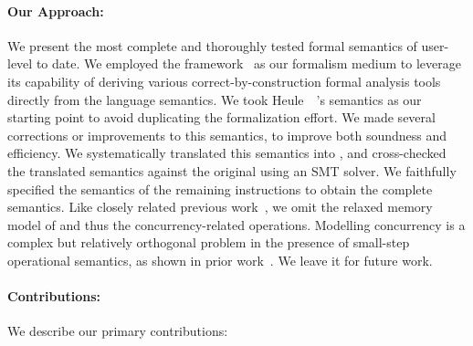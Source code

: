 \paragraph{Our Approach:}
%
We present the most complete and thoroughly tested formal semantics of user-level \ISA to date.
We employed the \K framework~\cite{k-primer-2013-v32} as our formalism medium to leverage its capability of deriving various correct-by-construction formal analysis tools directly from the language semantics.
We took Heule~\etal~\cite{Heule2016a}'s semantics as our starting point to avoid duplicating the formalization effort. %
We made several corrections or improvements to this semantics, to improve both soundness and efficiency.
We systematically translated this semantics into \K, and cross-checked the translated semantics against the original using an SMT solver.
We faithfully specified the semantics of the remaining instructions to obtain the complete semantics. %
Like closely related previous work~\cite{Goel:FMCAD14,Heule2016a}, we omit the relaxed memory model of \ISA and thus the concurrency-related operations.
Modelling concurrency is a complex but relatively orthogonal problem in the presence of small-step operational semantics, as shown in prior work~\cite{Sarkar:POPL09,Owens:x86-TSO}.
We leave it for future work.


\paragraph{Contributions:}
%
We describe our primary contributions:

